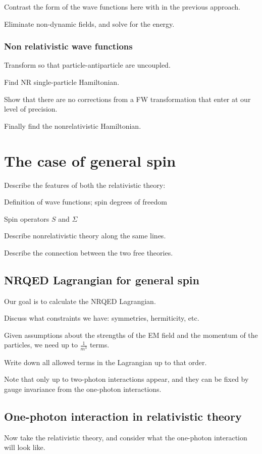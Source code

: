 \documentclass[12pt]{article}
\begin{document}
Contrast the form of the wave functions here with in the previous approach.

Eliminate non-dynamic fields, and solve for the energy.


\subsubsection{Non relativistic wave functions}
Transform so that particle-antiparticle are uncoupled.

Find NR single-particle Hamiltonian.

Show that there are no corrections from a FW transformation that enter at our level of precision.

Finally find the nonrelativistic Hamiltonian.


\section{The case of general spin}


Describe the features of both the relativistic theory:

 Definition of wave functions; spin degrees of freedom
 
 Spin operators $S$ and $\Sigma$


Describe nonrelativistic theory along the same lines.

Describe the connection between the two free theories.

\subsection{NRQED Lagrangian for general spin}
Our goal is to calculate the NRQED Lagrangian.  

Discuss what constraints we have: symmetries, hermiticity, etc.

Given assumptions about the strengths of the EM field and the momentum of the particles, we need up to $\frac{1}{m^3}$ terms.

Write down all allowed terms in the Lagrangian up to that order.

Note that only up to two-photon interactions appear, and they can be fixed by gauge invariance from the one-photon interactions.


\subsection{One-photon interaction in relativistic theory}
Now take the relativistic theory, and consider what the one-photon interaction will look like.
\end{document}
